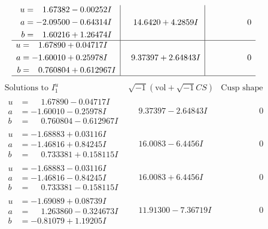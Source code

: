 \documentclass[1p]{elsarticle_modified}
\theoremstyle{definition}
\newcommand{\I}{\sqrt{-1}}
\begin{document}
$$\begin{array}{c|c|c}
\begin{aligned}
u &= \phantom{-}1.67382 - 0.00252 I \\
a &= -2.09500 - 0.64314 I \\
b &= \phantom{-}1.60216 + 1.26474 I\end{aligned}
 & \phantom{-}14.6420 + 4.2859 I & \phantom{-0.000000 } 0 \\ \hline\begin{aligned}
u &= \phantom{-}1.67890 + 0.04717 I \\
a &= -1.60010 + 0.25978 I \\
b &= \phantom{-}0.760804 + 0.612967 I\end{aligned}
 & \phantom{-}9.37397 + 2.64843 I & \phantom{-0.000000 } 0\\
 \hline 
 \end{array}$$\newpage$$\begin{array}{c|c|c}  
\text{Solutions to }I^u_{1}& \I (\text{vol} + \sqrt{-1}CS) & \text{Cusp shape}\\
 \hline 
\begin{aligned}
u &= \phantom{-}1.67890 - 0.04717 I \\
a &= -1.60010 - 0.25978 I \\
b &= \phantom{-}0.760804 - 0.612967 I\end{aligned}
 & \phantom{-}9.37397 - 2.64843 I & \phantom{-0.000000 } 0 \\ \hline\begin{aligned}
u &= -1.68883 + 0.03116 I \\
a &= -1.46816 + 0.84245 I \\
b &= \phantom{-}0.733381 + 0.158115 I\end{aligned}
 & \phantom{-}16.0083 - 6.4456 I & \phantom{-0.000000 } 0 \\ \hline\begin{aligned}
u &= -1.68883 - 0.03116 I \\
a &= -1.46816 - 0.84245 I \\
b &= \phantom{-}0.733381 - 0.158115 I\end{aligned}
 & \phantom{-}16.0083 + 6.4456 I & \phantom{-0.000000 } 0 \\ \hline\begin{aligned}
u &= -1.69089 + 0.08739 I \\
a &= \phantom{-}1.263860 - 0.324673 I \\
b &= -0.81079 + 1.19205 I\end{aligned}
 & \phantom{-}11.91300 - 7.36719 I & \phantom{-0.000000 } 0 \\ \hline\begin{aligned}

\end{aligned}
\end{array}$$
\end{document}
